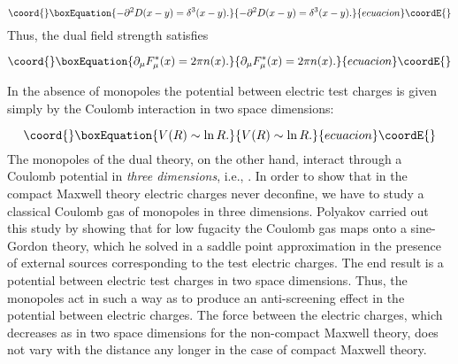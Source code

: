 \documentclass[a4paper,showpacs,preprintnumbers,amsmath,amssymb,prl,twocolumn]{revtex4}
\begin{document}
\begin{equation}\coord{}\boxEquation{
-\partial^2 D(x-y)=\delta^3(x-y).
}{
-\partial^2 D(x-y)=\delta^3(x-y).
}{ecuacion}\coordE{}\end{equation}
Thus, the dual field strength 
\coordHE{} satisfies 

\begin{equation}\coord{}\boxEquation{
\partial_\mu F^*_\mu(x)=2\pi n(x).
}{
\partial_\mu F^*_\mu(x)=2\pi n(x).
}{ecuacion}\coordE{}\end{equation}

In the absence of monopoles the potential between electric test 
charges is given simply by the Coulomb interaction in two 
space dimensions:

\begin{equation}\coord{}\boxEquation{
\label{pot1}
V(R)\sim\ln R. 
}{
V(R)\sim\ln R. 
}{ecuacion}\coordE{}\end{equation}
The monopoles of the dual theory, on the other hand, interact through a 
Coulomb potential in {\it three dimensions}, i.e., \coordHE{}. 
In order to show that in the compact Maxwell theory electric charges 
never deconfine, we have to study a classical Coulomb gas of 
monopoles in three dimensions. Polyakov \cite{Polyakov} carried out 
this study by showing that for low fugacity the Coulomb gas maps 
onto a sine-Gordon theory, which he solved in a saddle point 
approximation in the presence of external sources corresponding 
to the test electric charges. The end result is a potential 
between electric test charges \coordHE{} in two space dimensions. 
Thus, the monopoles act in such a way as to produce an anti-screening 
effect in the potential between electric charges. The force between 
the electric charges, which decreases as \coordHE{} in two space dimensions 
for the non-compact Maxwell theory, does not vary with the distance 
any longer in the case of compact Maxwell theory. 
\end{document}
